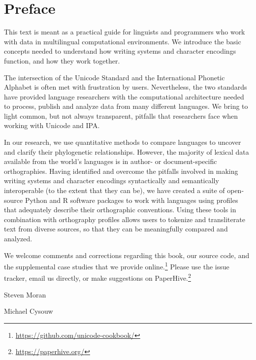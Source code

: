 \chapter{Preface}
\label{preface}

This text is meant as a practical guide for linguists and programmers who work with data in multilingual computational environments. We introduce the basic concepts needed to understand how writing systems and character encodings function, and how they work together.

The intersection of the Unicode Standard and the International Phonetic Alphabet is often met with frustration by users. Nevertheless, the two standards have provided language researchers with the computational architecture needed to process, publish and analyze data from many different languages. We bring to light common, but not always transparent, pitfalls that researchers face when working with Unicode and IPA. 

In our research, we use quantitative methods to compare languages to uncover and clarify their phylogenetic relationships. However, the majority of lexical data available from the world's languages is in author- or document-specific orthographies. Having identified and overcome the pitfalls involved in making writing systems and character encodings syntactically and semantically interoperable (to the extent that they can be), we have created a suite of open-source Python and R software packages to work with languages using profiles that adequately describe their orthographic conventions. Using these tools in combination with orthography profiles allows users to tokenize and transliterate text from diverse sources, so that they can be meaningfully compared and analyzed.

We welcome comments and corrections regarding this book, our source code, and the supplemental case studies that we provide online.\footnote{\url{https://github.com/unicode-cookbook/}} Please use the issue tracker, email us directly, or make suggestions on PaperHive.\footnote{\url{https://paperhive.org/}}

\bigbreak
\noindent Steven Moran

\noindent Michael Cysouw
